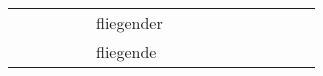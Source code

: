 \begin{center}
\begin{tabular}{lllllllllllllll}
       &            &                       &         &          &            fliegender &                                         &                                         &                                                    &                                         &                                                    &                                         &                                         &          &        \\
       &            &                       &         &          &             fliegende &                                         &                                         &                                                    &                                         &                                                    &                                         &                                         &          &        \\
\bottomrule
\end{tabular}

\end{center}